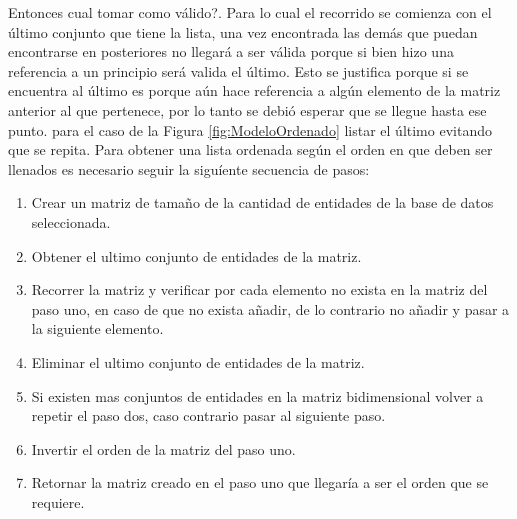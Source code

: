 Entonces cual tomar como v\'alido?.
Para lo cual el  recorrido se comienza con el \'ultimo conjunto que tiene la lista, una vez encontrada las dem\'as que puedan encontrarse en posteriores no llegar\'a a ser v\'alida porque si bien hizo una referencia a un principio ser\'a valida el \'ultimo. Esto se justifica porque si se encuentra al \'ultimo es porque a\'un hace referencia a alg\'un elemento de la matriz anterior al que pertenece, por lo tanto se debi\'o esperar que se llegue hasta ese punto. para el caso de la Figura \ref{fig:ModeloOrdenado} listar el \'ultimo evitando que se repita.
Para obtener una lista ordenada seg\'un el orden en que deben ser llenados es necesario seguir la sigu\'iente secuencia de pasos:
\begin{enumerate}
\item Crear un matriz de tama\~no de la cantidad de entidades de la base de datos seleccionada.
\item Obtener el ultimo conjunto de entidades de la matriz.
\item Recorrer la matriz y verificar por cada elemento no exista en la matriz del paso uno, en caso de que no exista a\~nadir, de lo contrario no a\~nadir y pasar a la siguiente elemento.
\item Eliminar el ultimo conjunto de entidades de la matriz.
\item Si existen mas conjuntos de entidades en la matriz bidimensional volver a repetir el paso dos, caso contrario pasar al siguiente paso.
\item Invertir el orden de la matriz del paso uno.
\item Retornar la matriz creado en el paso uno que llegar\'ia a ser el orden que se requiere.
\end{enumerate}
